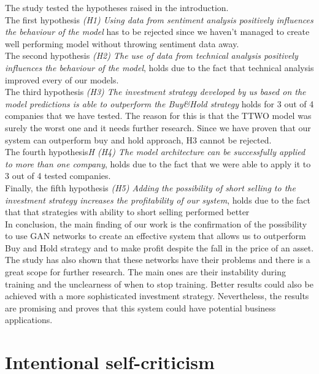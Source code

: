 \documentclass[11pt]{article} %
\begin{document}
The study tested the hypotheses raised in the introduction. \\ 

The first hypothesis \textit{(H1) Using data from sentiment analysis positively influences the behaviour of the model} has to be rejected since we haven't managed to create well performing model without throwing sentiment data away.\\

The second hypothesis\textit{ (H2) The use of data from technical analysis positively influences the behaviour of the model}, holds due to the fact that technical analysis improved every of our models. \\

The third hypothesis\textit{ (H3) The investment strategy developed by us based on the model predictions is able to outperform the Buy\&Hold strategy} holds for 3 out of 4 companies that we have tested. The reason for this is that the TTWO model was surely the worst one and it needs further research. Since we have proven that our system can outperform buy and hold approach, H3 cannot be rejected.\\

The fourth hypothesis\textit{H (H4) The model architecture can be successfully applied to more than one company}, holds due to the fact that we were able to apply it to 3 out of 4 tested companies. \\


Finally, the fifth hypothesis\textit{ (H5) Adding the possibility of short selling to the investment strategy increases the profitability of our system}, holds due to the fact that that strategies with ability to short selling performed better \\

In conclusion, the main finding of our work is the confirmation of the possibility to use GAN networks to create an effective system that allows us to outperform Buy and Hold strategy and to make profit despite the fall in the price of an asset. The study has also shown that these networks have their problems and there is a great scope for further research. The main ones are their instability during training and the unclearness of when to stop training.  Better results could also be achieved with a more sophisticated investment strategy. Nevertheless, the results are promising and proves that this system could have potential business applications.




\section{Intentional self-criticism}
\end{document}
